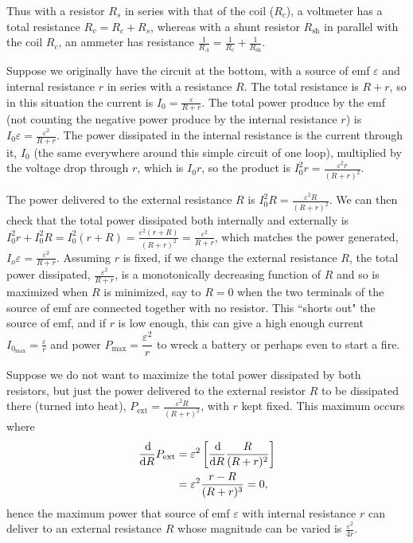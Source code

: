 Thus with a resistor $R_s$ in series with that of the coil ($R_c$), a voltmeter has a total resistance $R_v = R_c + R_s$, whereas with a shunt resistor $R_\text{sh}$ in parallel with the coil $R_c$, an ammeter has resistance $\frac{1}{R_A} = \frac{1}{R_c} + \frac{1}{R_\text{sh}}$.

Suppose we originally have the circuit at the bottom, with a source of emf $\varepsilon$ and internal resistance $r$ in series with a resistance $R$. The total resistance is $R + r$, so in this situation the current is $I_0 = \frac{\varepsilon}{R + r}$. The total power produce by the emf (not counting the negative power produce by the internal resistance $r$) is $I_0\varepsilon = \frac{\varepsilon^2}{R+r}$. The power dissipated in the internal resistance is the current through it, $I_0$ (the same everywhere around this simple circuit of one loop), multiplied by the voltage drop through $r$, which is $I_0r$, so the product is $I_0^2r = \frac{\varepsilon^2r}{(R+r)^2}$.

The power delivered to the external resistance $R$ is $I_0^2R = \frac{\varepsilon^2R}{(R+r)^2}$. We can then check that the total power dissipated both internally and externally is $I_0^2r + I_0^2R = I_0^2(r+R) = \frac{\varepsilon^2(r+R)}{(R+r)^2} = \frac{\varepsilon^2}{R + r}$, which matches the power generated, $I_o\varepsilon = \frac{\varepsilon^2}{R+r}$. Assuming $r$ is fixed, if we change the external resistance $R$, the total power dissipated, $\frac{\varepsilon^2}{R+r}$, is a monotonically decreasing function of $R$ and so is maximized when $R$ is minimized, say to $R=0$ when the two terminals of the source of emf are connected together with no resistor. This ``shorts out" the source of emf, and if $r$ is low enough, this can give a high enough current $I_{0_\text{max}} = \frac{\varepsilon}{r}$ and power $P_\text{max} = \dfrac{\varepsilon^2}{r}$ to wreck a battery or perhaps even to start a fire.

Suppose we do not want to maximize the total power dissipated by both resistors, but just the power delivered to the external resistor $R$ to be dissipated there (turned into heat), $P_\text{ext} = \frac{\varepsilon^2R}{(R+r)^2}$, with $r$ kept fixed. This maximum occurs where 
\begin{align*}
\dfrac{\operatorname{d\!}}{\operatorname{d\!} R} P_\text{ext} &= \varepsilon^2 \left[  \dfrac{\operatorname{d\!}}{\operatorname{d\!} R} \dfrac{R}{(R+r)^2}  \right] \\
&= \varepsilon^2 \dfrac{r-R}{(R+r)^3} = 0,
\end{align*}
hence the maximum power that source of emf $\varepsilon$ with internal resistance $r$ can deliver to an external resistance $R$ whose magnitude can be varied is $\frac{\varepsilon^2}{4r}$.


